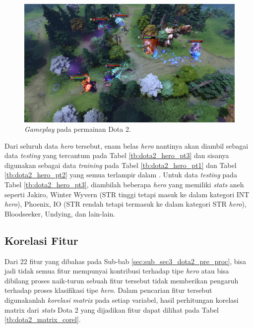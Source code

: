 \begin{figure} [!h] \centering
	\includegraphics[scale=0.13]{img/dota2_gameplay.jpg}
	\caption{\textit{Gameplay} pada permainan Dota 2.}
	\label{fig:dota2_gameplay}
\end{figure}

Dari seluruh data \textit{hero} tersebut, enam belas \textit{hero} nantinya akan diambil sebagai data \textit{testing} yang tercantum pada Tabel \ref{tb:dota2_hero_pt3} dan sisanya digunakan sebagai data \textit{training} pada Tabel \ref{tb:dota2_hero_pt1} dan Tabel \ref{tb:dota2_hero_pt2} yang semua terlampir dalam . Untuk data \textit{testing} pada Tabel \ref{tb:dota2_hero_pt3}, diambilah beberapa \textit{hero} yang memiliki \textit{stats} aneh seperti Jakiro, Winter Wyvern (STR tinggi tetapi masuk ke dalam kategori INT \textit{hero}), Phoenix, IO (STR rendah tetapi termasuk ke dalam kategori STR \textit{hero}), Bloodseeker, Undying, dan lain-lain.
\vspace{1ex}

\subsection{Korelasi Fitur}
\label{sec:sub_sec3_dota2_feature_corel}
\vspace{1ex}

Dari 22 fitur yang dibahas pada Sub-bab \ref{sec:sub_sec3_dota2_pre_proc}, bisa jadi tidak semua fitur mempunyai kontribusi terhadap tipe \textit{hero} atau bisa dibilang proses naik-turun sebuah fitur tersebut tidak memberikan pengaruh terhadap proses klasifikasi tipe \textit{hero}. Dalam pencarian fitur tersebut digunakanlah \textit{korelasi matrix} pada setiap variabel, hasil perhitungan korelasi matrix dari \textit{stats} Dota 2 yang dijadikan fitur dapat dilihat pada Tabel \ref{tb:dota2_matrix_corel}.
\vspace{-1ex}

